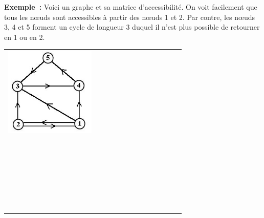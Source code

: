 			\textbf{Exemple~:} Voici un graphe et sa matrice d'accessibilité. 
			On voit facilement que tous les n{\oe}uds sont accessibles à
			partir des n{\oe}uds 1 et 2. Par contre, les n{\oe}uds 3, 4 et 5 
			forment un cycle de longueur 3 duquel il n'est plus
			possible de retourner en 1 ou en 2.

			\begin{center}
				\tablefirsthead{}
				\tablehead{}
				\tabletail{}
				\tablelasttail{}
				\begin{supertabular}{m{7.0350003cm}m{0.81600004cm}m{0.81600004cm}m{0.81600004cm}|m{0.81600004cm}|m{0.81600004cm}|m{0.81600004cm}|m{0.81600004cm}|m{0.81600004cm}|}
				\centering  \includegraphics[width=4.355cm,height=4.247cm]{image/a2012Logique2eme-img052.jpg}  &
				~
				 &
				~
				 &
				 &
				 &
				 &
				 &
				 &
				\\\hhline{~~~~-----}
				 &
				~
				 &
				~
				 &
				~
				 &
				 &
				 &
				 &
				 &
				\centering{}\\\hhline{~~~~-----}
				 &
				~
				 &
				~
				 &
				~
				 &
				 &
				 &
				 &
				 &
				\centering{}\\\hhline{~~~~-----}
				 &
				~
				 &
				~
				 &
				 &
				 &
				 &
				 &
				 &
				\centering{}\\\hhline{~~~~-----}
				 &
				~
				 &
				~
				 &
				~
				 &
				 &
				 &
				 &
				 &
				\centering{}\\\hhline{~~~~-----}
				 &
				~
				 &
				~
				 &
				~
				 &
				 &
				 &
				 &
				 &
				\centering{}\\\hhline{~~~~-----}
				 &
				~
				 &
				~
				 &
				 &
				 &
				 &
				 &
				 &
				\\
				\end{supertabular}
			\end{center}
			

